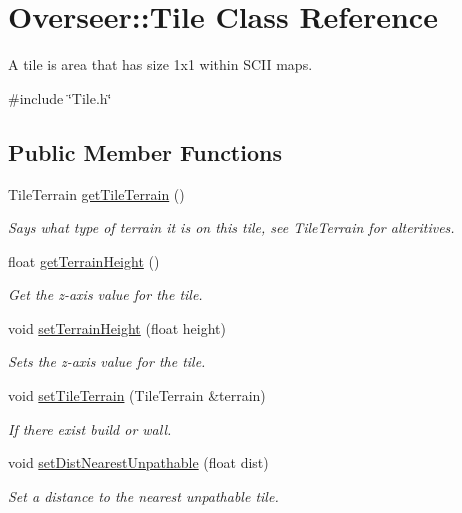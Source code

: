 \hypertarget{classOverseer_1_1Tile}{}\section{Overseer\+:\+:Tile Class Reference}
\label{classOverseer_1_1Tile}


A tile is area that has size 1x1 within S\+C\+II maps.  




{\ttfamily \#include \char`\"{}Tile.\+h\char`\"{}}

\subsection*{Public Member Functions}
\begin{DoxyCompactItemize}
\item 
Tile\+Terrain \hyperlink{classOverseer_1_1Tile_aeddd0f013514a193e8da23bdeafdd6b9}{get\+Tile\+Terrain} ()
\begin{DoxyCompactList}\small\item\em Says what type of terrain it is on this tile, see Tile\+Terrain for alteritives. \end{DoxyCompactList}\item 
float \hyperlink{classOverseer_1_1Tile_a22171679810a298d4119b997004d3e13}{get\+Terrain\+Height} ()
\begin{DoxyCompactList}\small\item\em Get the z-\/axis value for the tile. \end{DoxyCompactList}\item 
void \hyperlink{classOverseer_1_1Tile_a79f2aa12d9463e7e4bfc85b8bdddbc34}{set\+Terrain\+Height} (float height)
\begin{DoxyCompactList}\small\item\em Sets the z-\/axis value for the tile. \end{DoxyCompactList}\item 
void \hyperlink{classOverseer_1_1Tile_a22494032e2b92af9c4e4b375845fd80f}{set\+Tile\+Terrain} (Tile\+Terrain \&terrain)
\begin{DoxyCompactList}\small\item\em If there exist build or wall. \end{DoxyCompactList}\item 
void \hyperlink{classOverseer_1_1Tile_a5a3b3f84b703b2cd5a9ae56b60e77b4c}{set\+Dist\+Nearest\+Unpathable} (float dist)
\begin{DoxyCompactList}\small\item\em Set a distance to the nearest unpathable tile. \end{DoxyCompactList}\item 

\end{DoxyCompactItemize}
